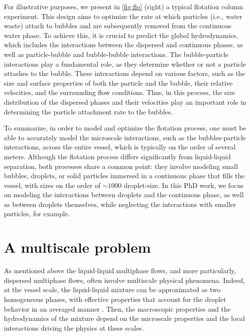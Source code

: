 For illustrative purposes, we present in \ref{fig:flo} (right) a typical flotation column experiment. 
This design aims to optimize the rate at which particles (i.e., water waste) attach to bubbles and are subsequently removed from the continuous water phase. 
To achieve this, it is crucial to predict the global hydrodynamics, which includes the interactions between the dispersed and continuous phases, as well as particle-bubble and bubble-bubble interactions.
The bubble-particle interactions play a fundamental role, as they determine whether or not a particle attaches to the bubble. 
These interactions depend on various factors, such as the size and surface properties of both the particle and the bubble, their relative velocities, and the surrounding flow conditions. 
Thus, in this process, the size distribution of the dispersed phases and their velocities play an important role in determining the particle attachment rate to the bubbles.



To summarize, in order to model and optimize the flotation process, one must be able to accurately model the microscale interactions, such as the bubbles-particle interactions, across the entire vessel, which is typically on the order of several meters. 
Although the flotation process differs significantly from liquid-liquid separation, both processes share a common point: they involve modeling small bubbles, droplets, or solid particles immersed in a continuous phase that fills the vessel, with sizes on the order of $\sim 1000$ droplet-size. 
In this PhD work, we focus on modeling the interactions between droplets and the continuous phase, as well as between droplets themselves, while neglecting the interactions with smaller particles, for example. 



\section{A multiscale problem} 


As mentioned above the liquid-liquid multiphase flows, and more particularly, dispersed multiphase flows, often involve multiscale physical phenomena. 
Indeed, at the vessel scale, the liquid-liquid mixture can be approximated as two homogeneous phases, with effective properties that account for the droplet behavior in an averaged manner \citet{jackson2000}.
Then, the macroscopic properties and the hydrodynamics of the mixture depend on the microscale properties and the local interactions driving the physics at these scales. 

